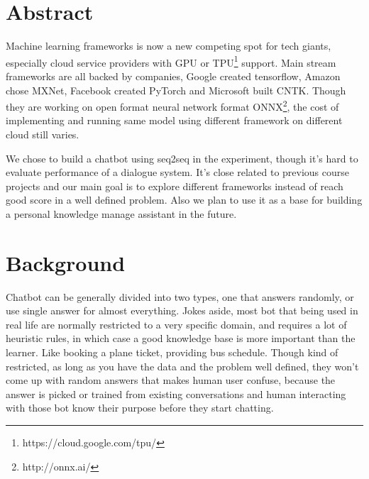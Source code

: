 \documentclass[11pt,letterpaper,twocolumn,oneside]{article}
\begin{document}

\section{Abstract}

Machine learning frameworks is now a new competing spot for tech giants,
especially cloud service providers with GPU or TPU\footnote{https://cloud.google.com/tpu/} support.
Main stream frameworks are all backed by companies,
Google created tensorflow, Amazon chose MXNet, Facebook created PyTorch and Microsoft built CNTK.
Though they are working on open format neural network format ONNX\footnote{http://onnx.ai/},
the cost of implementing and running same model using different framework on different cloud still varies.

We chose to build a chatbot using seq2seq in the experiment,
though it's hard to evaluate performance of a dialogue system\cite{liu2016not}.
It's close related to previous course projects and our main goal is to explore different frameworks
instead of reach good score in a well defined problem.
Also we plan to use it as a base for building a personal knowledge manage assistant in the future.

\section{Background}

Chatbot can be generally divided into two types,
one that answers randomly, or use single answer for almost everything.
Jokes aside, most bot that being used in real life are normally restricted to a very specific domain,
and requires a lot of heuristic rules, in which case a good knowledge base is more important than the learner.
Like booking a plane ticket, providing bus schedule.
Though kind of restricted, as long as you have the data and the problem well defined,
they won't come up with random answers that makes human user confuse, because the answer
is picked or trained from existing conversations and human interacting with those bot
know their purpose before they start chatting.
\end{document}
